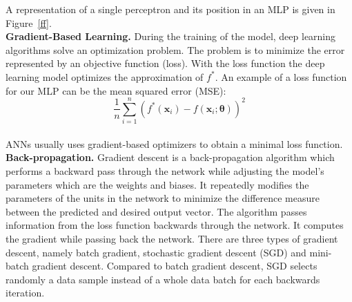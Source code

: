A representation of a single perceptron and its position in an MLP is given in
Figure~\ref{ff}.\\



\textbf{Gradient-Based Learning.} During the training of the model, deep
learning algorithms solve an optimization problem. The problem is to minimize
the error represented by an objective function (loss).  With the loss function
the deep learning model optimizes the approximation of $f^{*}$. An example of a
loss function for our MLP can be the mean squared error (MSE):\\

\begin{equation} 
  \frac{1}{n}\sum_{i=1}^n(f^*(\bm x_i)-f(\bm x_i;\bm{\theta}))^2
\end{equation}~\\

ANNs usually uses gradient-based optimizers to obtain a minimal loss function.\\


\textbf{Back-propagation.} Gradient descent is a back-propagation algorithm
which performs a backward pass through the network while adjusting the model's
parameters which are the weights and biases. It repeatedly modifies the
parameters of the units in the network to minimize the difference measure
between the predicted and desired output vector.  The algorithm passes
information from the loss function backwards through the network. It computes
the gradient while passing back the network.  There are three types of gradient
descent, namely batch gradient, stochastic gradient descent (SGD) and mini-batch
gradient descent. Compared to batch gradient descent, SGD selects randomly a
data sample instead of a whole data batch for each backwards iteration.
